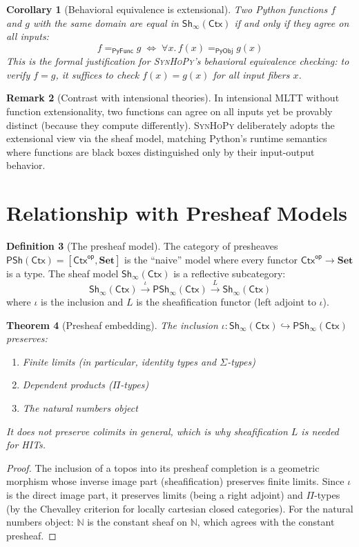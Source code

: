 \documentclass[11pt,a4paper]{report}
\theoremstyle{definition}
\newtheorem{definition}{Definition}[chapter]
\newtheorem{remark}[definition]{Remark}
\theoremstyle{plain}
\newtheorem{theorem}[definition]{Theorem}
\newtheorem{corollary}[definition]{Corollary}
\newcommand{\Nat}{\mathbb{N}}
\newcommand{\Set}{\mathbf{Set}}
\newcommand{\PyObj}{\mathsf{PyObj}}
\newcommand{\PyFunc}{\mathsf{PyFunc}}
\newcommand{\Ctx}{\mathsf{Ctx}}
\newcommand{\synhopy}{\textsc{SynHoPy}}
\newcommand{\Sh}{\mathsf{Sh}}
\begin{document}
\begin{corollary}[Behavioral equivalence is extensional]
\label{cor:behavioral-ext}
Two Python functions $f$ and $g$ with the same domain are equal in
$\Sh_\infty(\Ctx)$ if and only if they agree on all inputs:
\[
  f =_{\PyFunc} g \;\iff\; \forall x.\, f(x) =_{\PyObj} g(x)
\]
This is the formal justification for \synhopy{}'s behavioral equivalence
checking: to verify $f = g$, it suffices to check $f(x) = g(x)$ for all
input fibers $x$.
\end{corollary}

\begin{remark}[Contrast with intensional theories]
In intensional MLTT without function extensionality, two functions can agree on
all inputs yet be provably distinct (because they compute differently).
\synhopy{} deliberately adopts the extensional view via the sheaf model,
matching Python's runtime semantics where functions are black boxes distinguished
only by their input-output behavior.
\end{remark}


\section{Relationship with Presheaf Models}

\begin{definition}[The presheaf model]
The category of presheaves $\mathsf{PSh}(\Ctx) = [\Ctx^{\mathsf{op}}, \Set]$
is the ``naive'' model where every functor $\Ctx^{\mathsf{op}} \to \Set$ is a
type.  The sheaf model $\Sh_\infty(\Ctx)$ is a reflective subcategory:
\[
  \Sh_\infty(\Ctx) \xrightarrow{\;\iota\;} \mathsf{PSh}_\infty(\Ctx)
  \xrightarrow{\;L\;} \Sh_\infty(\Ctx)
\]
where $\iota$ is the inclusion and $L$ is the sheafification functor (left
adjoint to $\iota$).
\end{definition}

\begin{theorem}[Presheaf embedding]
\label{thm:presheaf-embed}
The inclusion $\iota : \Sh_\infty(\Ctx) \hookrightarrow \mathsf{PSh}_\infty(\Ctx)$
preserves:
\begin{enumerate}
  \item Finite limits (in particular, identity types and $\Sigma$-types)
  \item Dependent products ($\Pi$-types)
  \item The natural numbers object
\end{enumerate}
It does \emph{not} preserve colimits in general, which is why sheafification $L$
is needed for HITs.
\end{theorem}
\begin{proof}
The inclusion of a topos into its presheaf completion is a geometric morphism
whose inverse image part (sheafification) preserves finite limits.  Since $\iota$
is the direct image part, it preserves limits (being a right adjoint) and
$\Pi$-types (by the Chevalley criterion for locally cartesian closed categories).
For the natural numbers object: $\Nat$ is the constant sheaf on $\mathbb{N}$,
which agrees with the constant presheaf.
\end{proof}
\end{document}
